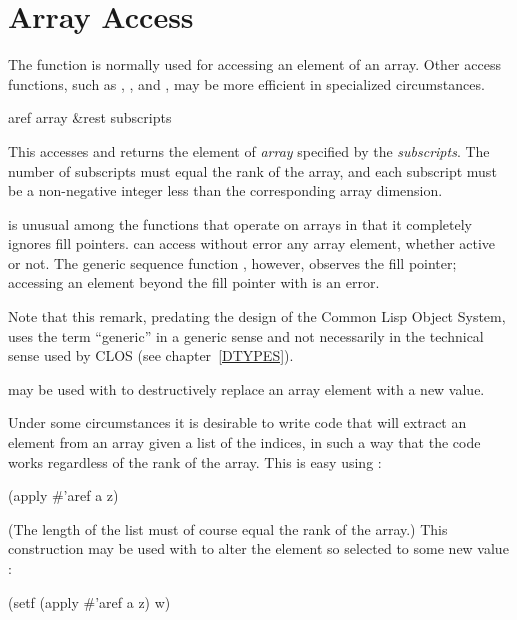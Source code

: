 \section{Array Access}

The function  is normally
used for accessing an element of an array.
Other access functions, such as , , and ,
may be more efficient in specialized circumstances.

\begin{defun}[Function]
aref array &rest subscripts

This accesses and returns the element of \emph{array} specified
by the \emph{subscripts}.  The number of subscripts must
equal the rank of the array, and each subscript must be
a non-negative integer less than the corresponding array dimension.

 is unusual among the functions that operate on arrays
in that it completely ignores fill pointers.   can access
without error any array element, whether active or not.  The generic
sequence function , however, observes the fill pointer;
accessing an element beyond the fill pointer with  is an error.

\begin{new}
Note that this remark, predating the design of the Common Lisp Object System,
uses the term ``generic'' in a generic sense and not necessarily
in the technical sense used by CLOS
(see chapter~\ref{DTYPES}).
\end{new}

 may be used with  to destructively replace
an array element with a new value.

Under some circumstances it is desirable to write code that
will extract an element from an array  given a list  of the indices,
in such a way that the code works regardless of the rank of the
array.  This is easy using :
\begin{lisp}
(apply \#'aref a z)
\end{lisp}
(The length of the list must of course equal the rank of
the array.)  This construction may be used with  to alter
the element so selected to some new value :
\begin{lisp}
(setf (apply \#'aref a z) w)
\end{lisp}
\end{defun}

